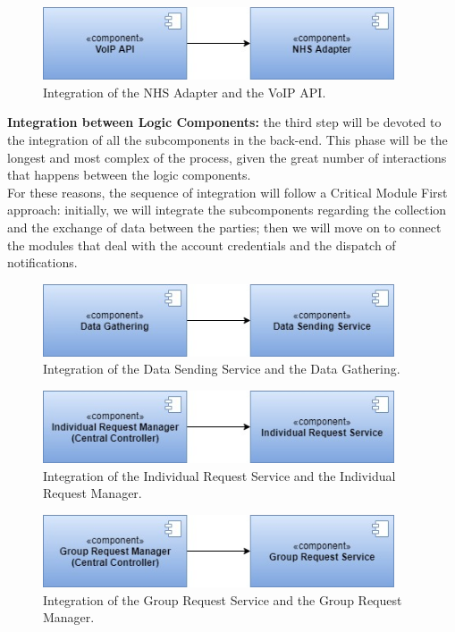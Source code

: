 \begin{figure}[H]
    \centering
    \includegraphics[width=295pt]{images/IntegrationSequence/TrackMe-Integration_sequence20.jpg}
    \caption{Integration of the NHS Adapter and the VoIP API.}
\end{figure}
\clearpage
\noindent\textbf{Integration between Logic Components:} the third step will be devoted to the integration of all the subcomponents in the back-end. This phase will be the longest and most complex of the process, given the great number of interactions that happens between the logic components. \\
For these reasons, the sequence of integration will follow a Critical Module First approach: initially, we will integrate the subcomponents regarding the collection and the exchange of data between the parties; then we will move on to connect the modules that deal with the account credentials and the dispatch of notifications.
\begin{figure}[H]
    \centering
    \includegraphics[width=295pt]{images/IntegrationSequence/TrackMe-Integration_sequence10.jpg}
    \caption{Integration of the Data Sending Service and the Data Gathering.}
\end{figure}
\begin{figure}[H]
    \centering
    \includegraphics[width=295pt]{images/IntegrationSequence/TrackMe-Integration_sequence13.jpg}
    \caption{Integration of the Individual Request Service and the Individual Request Manager.}
\end{figure}
\begin{figure}[H]
    \centering
    \includegraphics[width=295pt]{images/IntegrationSequence/TrackMe-Integration_sequence14.jpg}
    \caption{Integration of the Group Request Service and the Group Request Manager.}
\end{figure}

